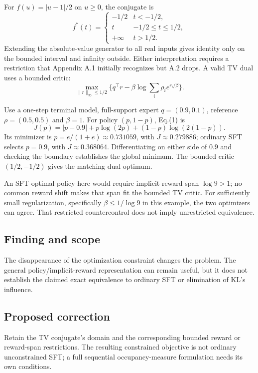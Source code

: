 \documentclass[11pt]{article}
\begin{document}
For \(f(u)=|u-1|/2\) on \(u\ge0\), the conjugate is \[f^*(t)=\begin{cases}-1/2&t<-1/2,\\t&-1/2\le t\le1/2,\\+\infty&t>1/2.\end{cases}\] Extending the absolute-value generator to all real inputs gives identity only on the bounded interval and infinity outside. Either interpretation requires a restriction that Appendix A.1 initially recognizes but A.2 drops. A valid TV dual uses a bounded critic: \[\max_{\|r\|_\infty\le1/2}\{q^\top r-\beta\log\sum_i\rho_i e^{r_i/\beta}\}.\]

Use a one-step terminal model, full-support expert \(q=(0.9,0.1)\), reference \(\rho=(0.5,0.5)\) and \(\beta=1\). For policy \((p,1-p)\), Eq.(1) is \[J(p)=|p-0.9|+p\log(2p)+(1-p)\log(2(1-p)).\] Its minimizer is \(p=e/(1+e)\approx0.731059\), with \(J\approx0.279886\); ordinary SFT selects \(p=0.9\), with \(J\approx0.368064\). Differentiating on either side of \(0.9\) and checking the boundary establishes the global minimum. The bounded critic \((1/2,-1/2)\) gives the matching dual optimum.

An SFT-optimal policy here would require implicit reward span \(\log9>1\); no common reward shift makes that span fit the bounded TV critic. For sufficiently small regularization, specifically \(\beta\le1/\log9\) in this example, the two optimizers can agree. That restricted countercontrol does not imply unrestricted equivalence.

\subsection*{Finding and scope}

The disappearance of the optimization constraint changes the problem. The general policy/implicit-reward representation can remain useful, but it does not establish the claimed exact equivalence to ordinary SFT or elimination of KL’s influence.

\subsection*{Proposed correction}

Retain the TV conjugate’s domain and the corresponding bounded reward or reward-span restrictions. The resulting constrained objective is not ordinary unconstrained SFT; a full sequential occupancy-measure formulation needs its own conditions.
\end{document}
